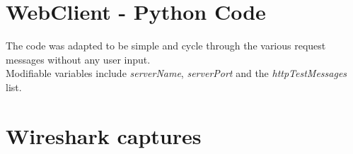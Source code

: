\documentclass[11pt,a4paper]{report}
\begin{document}
    \section{WebClient - Python Code}
        \lstset{style=pythoncode}
        
        
        The code was adapted to be simple and cycle through the various request messages without any user input. \\
        Modifiable variables include \textit{serverName}, \textit{serverPort} and the \textit{httpTestMessages} list.

    
    \section{Wireshark captures}
\end{document}
